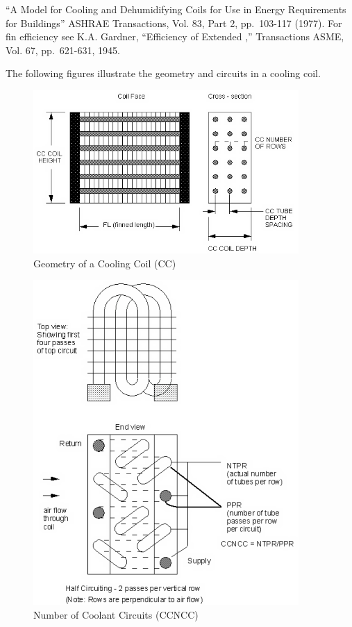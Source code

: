 ``A Model for Cooling and Dehumidifying Coils for Use in Energy Requirements for Buildings'' ASHRAE Transactions, Vol. 83, Part 2, pp.~103-117 (1977). For fin efficiency see K.A. Gardner, ``Efficiency of Extended ,'' Transactions ASME, Vol. 67, pp.~621-631, 1945.

The following figures illustrate the geometry and circuits in a cooling coil.

\begin{figure}[hbtp] %
\centering
\includegraphics[width=0.9\textwidth, height=0.9\textheight, keepaspectratio=true]{media/image353.png}
\caption{Geometry of a Cooling Coil (CC) \protect \label{fig:geometry-of-a-cooling-coil-cc}}
\end{figure}

\begin{figure}[hbtp] %
\centering
\includegraphics[width=0.9\textwidth, height=0.9\textheight, keepaspectratio=true]{media/image354.png}
\caption{Number of Coolant Circuits (CCNCC) \protect \label{fig:number-of-coolant-circuits-ccncc}}
\end{figure}

